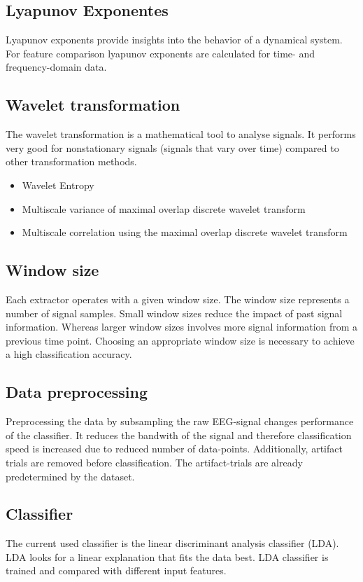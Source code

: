 \documentclass{article}
\begin{document}
\subsection{Lyapunov Exponentes}
Lyapunov exponents provide insights into the behavior of a dynamical system. For feature comparison lyapunov exponents are calculated for time- and frequency-domain data.

\subsection{Wavelet transformation}
The wavelet transformation is a mathematical tool to analyse signals. It performs very good for nonstationary signals (signals that vary over time) compared to other transformation methods. 
\begin{itemize}
    \item Wavelet Entropy \parencite{wentropy}
    \item Multiscale variance of maximal overlap discrete wavelet transform \parencite{wvariance}
    \item Multiscale correlation using the maximal overlap discrete wavelet transform \parencite{wcorrelation}
\end{itemize}

\subsection{Window size}
Each extractor operates with a given window size. The window size represents a number of signal samples. Small window sizes reduce the impact of past signal information. Whereas larger window sizes involves more signal information from a previous time point. Choosing an appropriate window size is necessary to achieve a high classification accuracy.

\subsection{Data preprocessing}
Preprocessing the data by subsampling the raw EEG-signal changes performance of the classifier. It reduces the bandwith of the signal and therefore classification speed is increased due to reduced number of data-points. Additionally, artifact trials are removed before classification. The artifact-trials are already predetermined by the dataset.

\subsection{Classifier}
The current used classifier is the linear discriminant analysis classifier (LDA). LDA looks for a linear explanation that fits the data best. LDA classifier is trained and compared with different input features.
\end{document}
